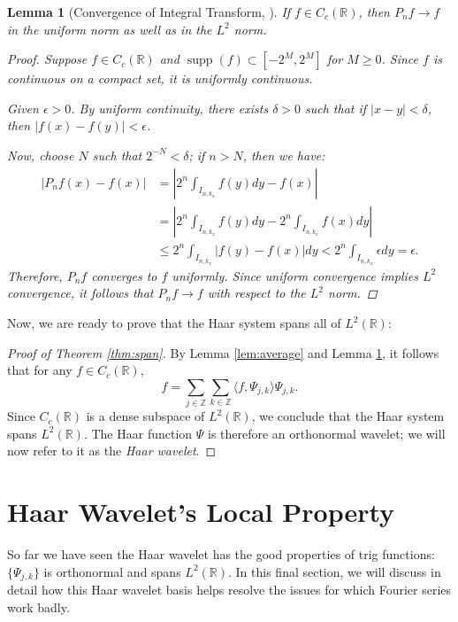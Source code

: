 \documentclass[11pt]{amsart}
\theoremstyle{theorem} %
\newtheorem{lem}[thm]{Lemma} %
\theoremstyle{definition}
\theoremstyle{example}
\theoremstyle{remark}
\numberwithin{equation}{section}
\newcommand{\R}{\mathbb{R}}
\newcommand{\Z}{\mathbb{Z}}
\DeclareMathOperator*{\supp}{supp}
\begin{document}
\begin{lem}[Convergence of Integral Transform, {\cite[517]{davidson}}] \label{lem:convergence}
	If $ f \in C_c(\R) $, then $ P_nf \to f $ in the uniform norm as well as in the $ L^2 $ norm.
	
	\begin{proof}
		Suppose $ f \in C_c(\R) $ and $ \supp(f) \subset [-2^M, 2^M] $ for $ M \geq 0 $. Since $ f $ is continuous on a compact set, it is uniformly continuous.
		
		Given $ \epsilon > 0 $. By uniform continuity, there exists $ \delta > 0 $ such that if $ |x-y| < \delta $, then $ |f(x) - f(y)| < \epsilon $.
		
		Now, choose $ N $ such that $ 2^{-N} < \delta $; if $ n > N $, then we have:
		\begin{align*}
		|P_nf(x) - f(x)| &= \left| 2^n \int_{I_{n,k_x}} f(y)dy - f(x) \right| \\
		&=  \left| 2^n \int_{I_{n,k_x}} f(y)dy - 2^n \int_{I_{n,k_x}} f(x) dy \right| \\
		&\leq 2^n \int_{I_{n,k_x}} |f(y) - f(x)| dy 
		< 2^n \int_{I_{n,k_x}} \epsilon dy = \epsilon.
		\end{align*}
		Therefore, $ P_nf $ converges to $ f $ uniformly. Since uniform convergence implies $ L^2 $ convergence, it follows that $ P_nf \to f $ with respect to the $ L^2 $ norm.
	\end{proof}
\end{lem}

Now, we are ready to prove that the Haar system spans all of $ L^2(\R) $:

\begin{proof}[Proof of Theorem \ref{thm:span}]
	By Lemma \ref{lem:average} and Lemma \ref{lem:convergence}, it follows that for any $ f \in C_c(\R) $, 
	\[
	f = \sum_{j \in \Z} \sum_{k \in \Z} \langle f, \varPsi_{j,k} \rangle \varPsi_{j,k}.
	\]
	Since $ C_c(\R) $ is a dense subspace of $ L^2(\R) $, we conclude that the Haar system spans $ L^2(\R) $. The Haar function $ \varPsi $ is therefore an orthonormal wavelet; we will now refer to it as the \emph{Haar wavelet}.
\end{proof}


\section{Haar Wavelet's Local Property} \label{section:application}
So far we have seen the Haar wavelet has the good properties of trig functions: $ \{ \varPsi_{j,k} \} $ is orthonormal and spans $ L^2(\R) $. In this final section, we will discuss in detail how this Haar wavelet basis helps resolve the issues for which Fourier series work badly.
\end{document}
